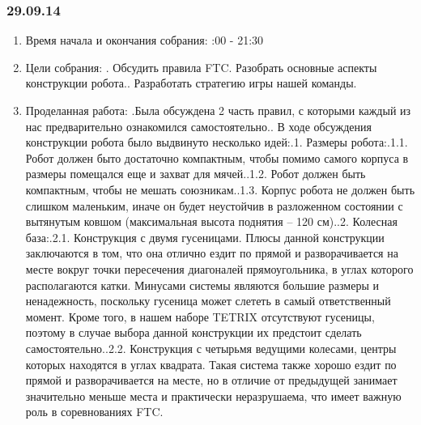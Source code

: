 \documentclass[12pt]{article}
\begin{document}
	      \subsubsection{29.09.14}
	      \begin{enumerate}
	      	\item Время начала и окончания собрания:
	      	:00 - 21:30
	      	\item Цели собрания:
	      	. Обсудить правила FTC. Разобрать основные аспекты конструкции робота.. Разработать стратегию игры нашей команды.\newline
	      	\item Проделанная работа:
	      	.Была обсуждена 2 часть правил, с которыми каждый из нас предварительно ознакомился самостоятельно..	 В ходе обсуждения конструкции робота было выдвинуто несколько идей:.1.	Размеры робота:.1.1.	Робот должен быто достаточно компактным, чтобы помимо самого корпуса в размеры помещался еще и захват для мячей..1.2.	Робот должен быть компактным, чтобы не мешать союзникам..1.3.	Корпус робота не должен быть слишком маленьким, иначе он будет неустойчив в разложенном состоянии с вытянутым ковшом (максимальная высота поднятия – 120 см)..2.	Колесная база:.2.1.	Конструкция с двумя гусеницами. Плюсы данной конструкции заключаются в том, что она отлично ездит по прямой  и разворачивается на месте вокруг точки пересечения диагоналей прямоугольника, в углах которого располагаются катки. Минусами системы являются большие размеры и ненадежность, поскольку гусеница может слететь в самый ответственный момент. Кроме того, в нашем наборе TETRIX отсутствуют гусеницы, поэтому в случае выбора данной конструкции их предстоит сделать самостоятельно..2.2.	Конструкция с четырьмя ведущими колесами, центры которых находятся в углах квадрата. Такая система также хорошо ездит по прямой и разворачивается на месте, но в отличие от предыдущей занимает значительно меньше места и практически неразрушаема, что имеет важную роль в соревнованиях FTC.\newline

\end{enumerate}
\end{document}
